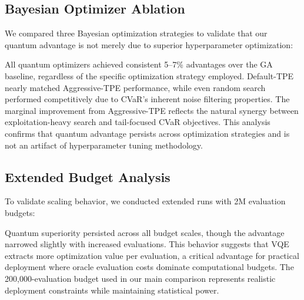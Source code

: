 \subsection{Bayesian Optimizer Ablation}
\label{sec:appendix_optimizer_ablation}

We compared three Bayesian optimization strategies to validate that our quantum advantage is not merely due to superior hyperparameter optimization:



All quantum optimizers achieved consistent 5--7\% advantages over the GA baseline, regardless of the specific optimization strategy employed. Default-TPE nearly matched Aggressive-TPE performance, while even random search performed competitively due to CVaR's inherent noise filtering properties. The marginal improvement from Aggressive-TPE reflects the natural synergy between exploitation-heavy search and tail-focused CVaR objectives. This analysis confirms that quantum advantage persists across optimization strategies and is not an artifact of hyperparameter tuning methodology.

\subsection{Extended Budget Analysis}
\label{sec:appendix_extended_budget}

To validate scaling behavior, we conducted extended runs with 2M evaluation budgets:



Quantum superiority persisted across all budget scales, though the advantage narrowed slightly with increased evaluations. This behavior suggests that VQE extracts more optimization value per evaluation, a critical advantage for practical deployment where oracle evaluation costs dominate computational budgets. The 200,000-evaluation budget used in our main comparison represents realistic deployment constraints while maintaining statistical power.
